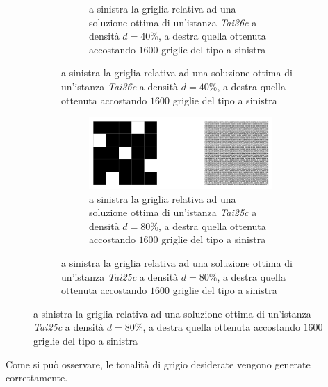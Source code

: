 \begin{figure}[h!]
\begin{subfigure}[b]{\textwidth}
\begin{subfigure}[b]{0.7\textwidth}
            \caption{a sinistra la griglia relativa ad una soluzione ottima di un'istanza \textit{Tai36c} a densità $d=40\%$, 
                \newline a destra quella ottenuta accostando $1600$ griglie del tipo a sinistra}
        \end{subfigure}
    \end{subfigure}
    \centering
    \begin{subfigure}[b]{\textwidth}
        \centering
        \begin{subfigure}[b]{0.7\textwidth}
            \includegraphics[width=\columnwidth]{images/gray_25_80.png}
            \caption{a sinistra la griglia relativa ad una soluzione ottima di un'istanza \textit{Tai25c} a densità $d=80\%$, 
                \newline a destra quella ottenuta accostando $1600$ griglie del tipo a sinistra}
        \end{subfigure}
    \end{subfigure}
\end{figure}

\noindent
Come si può osservare, le tonalità di grigio desiderate vengono generate correttamente.